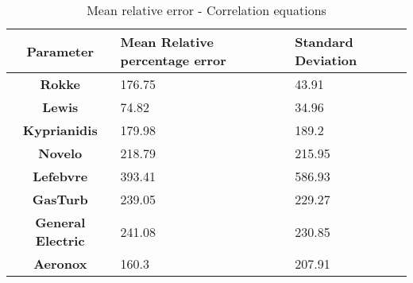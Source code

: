 \begin{table}[h!]
  \centering
  \begin{tabularx}{\textwidth}{||c|X|X||}
  \hline
    \cellcolor{gray!20}\textbf{Parameter} & \cellcolor{gray!20}\textbf{Mean Relative percentage error} & \cellcolor{gray!20}\textbf{Standard Deviation} \\ [0.5ex]
  \hline\hline
\centering
    \cellcolor{gray!20}\textbf{Rokke} & 176.75 & 43.91 \\
  \hline
    \cellcolor{gray!20}\textbf{Lewis} & 74.82 & 34.96 \\
  \hline
    \cellcolor{gray!20}\textbf{Kyprianidis} & 179.98 & 189.2 \\
  \hline
    \cellcolor{gray!20}\textbf{Novelo} & 218.79 & 215.95 \\
  \hline
    \cellcolor{gray!20}\textbf{Lefebvre} & 393.41 & 586.93 \\
  \hline
    \cellcolor{gray!20}\textbf{GasTurb} & 239.05 & 229.27 \\
  \hline
    \cellcolor{gray!20}\textbf{General Electric} & 241.08 & 230.85 \\
  \hline
    \cellcolor{gray!20}\textbf{Aeronox} & 160.3 & 207.91 \\
  \hline
  \end{tabularx}
  \caption{Mean relative error - Correlation equations}
  \label{meanEC}
\end{table}
